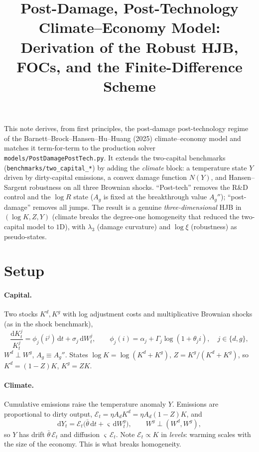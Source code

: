 \documentclass[11pt]{article}
\title{Post-Damage, Post-Technology Climate--Economy Model:\\
Derivation of the Robust HJB, FOCs, and the Finite-Difference Scheme}
\author{}
\date{}
\newcommand{\dd}{\mathrm{d}}
\newcommand{\E}{\mathcal E}
\begin{document}
\maketitle
\vspace{-3em}

This note derives, from first principles, the post-damage post-technology regime of the
Barnett--Brock--Hansen--Hu--Huang (2025) climate--economy model and matches it term-for-term
to the production solver \texttt{models/PostDamagePostTech.py}. It extends the two-capital
benchmarks (\texttt{benchmarks/two\_capital\_*}) by adding the \emph{climate} block: a
temperature state $Y$ driven by dirty-capital emissions, a convex damage function $N(Y)$, and
Hansen--Sargent robustness on all three Brownian shocks. ``Post-tech'' removes the R\&D control
and the $\log R$ state ($A_g$ is fixed at the breakthrough value $A_g''$); ``post-damage''
removes all jumps. The result is a genuine \emph{three-dimensional} HJB in $(\log K, Z, Y)$
(climate breaks the degree-one homogeneity that reduced the two-capital model to $1$D), with
$\lambda_3$ (damage curvature) and $\log\xi$ (robustness) as pseudo-states.

\section{Setup}

\paragraph{Capital.} Two stocks $K^d,K^g$ with log adjustment costs and multiplicative
Brownian shocks (as in the shock benchmark),
\[
\frac{\dd K^j_t}{K^j_t}=\phi_j(i^j)\,\dd t+\sigma_j\,\dd W^j_t,\qquad
\phi_j(i)=\alpha_j+\Gamma_j\log(1+\theta_j i),\quad j\in\{d,g\},
\]
$W^d\perp W^g$, $A_g\equiv A_g''$. States $\log K=\log(K^d+K^g)$, $Z=K^g/(K^d+K^g)$, so
$K^d=(1-Z)K$, $K^g=ZK$.

\paragraph{Climate.} Cumulative emissions raise the temperature anomaly $Y$. Emissions are
proportional to dirty output, $\E_t=\eta A_d K^d=\eta A_d(1-Z)K$, and
\[
\dd Y_t=\E_t\big(\bar\theta\,\dd t+\varsigma\,\dd W^y_t\big),\qquad W^y\perp(W^d,W^g),
\]
so $Y$ has drift $\bar\theta\,\E_t$ and diffusion $\varsigma\,\E_t$. Note $\E_t\propto K$ in
\emph{levels}: warming scales with the size of the economy. This is what breaks homogeneity.
\end{document}
